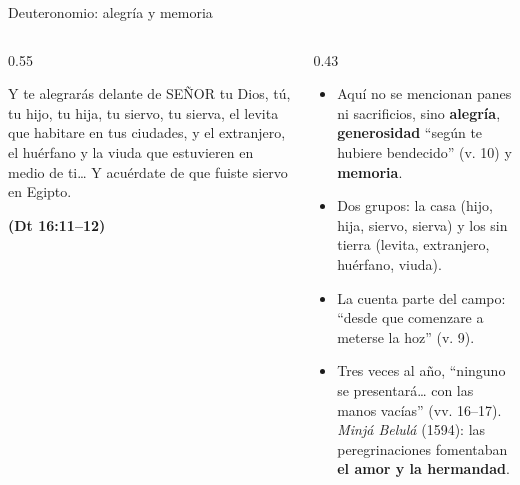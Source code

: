 \documentclass[hyperref={bookmarks=false},aspectratio=169]{beamer}
\newcommand{\SENOR}{S{\fontsize{0.78em}{1em}\selectfont EÑOR}}
\newcommand{\fuente}[1]{\par\hfill{\upshape\bfseries\footnotesize\textcolor{tierraroja}{#1}}}
\newcommand{\destacar}[1]{\textbf{\textcolor{tierraroja}{#1}}}
\begin{document}
\begin{frame}{Deuteronomio: alegría y memoria}
\begin{columns}[c,onlytextwidth]
\begin{column}{0.55\textwidth}
\begin{cita}Y te alegrarás delante de \SENOR{} tu Dios, tú, tu hijo, tu hija, tu siervo, tu sierva, el levita que habitare en tus ciudades, y el extranjero, el huérfano y la viuda que estuvieren en medio de ti\ldots{} Y acuérdate de que fuiste siervo en Egipto.\fuente{(Dt 16:11--12)}\end{cita}
\end{column}
\begin{column}{0.43\textwidth}\small
\begin{itemize}
\item Aquí no se mencionan panes ni sacrificios, sino \destacar{alegría}, \destacar{generosidad} ``según te hubiere bendecido'' (v. 10) y \destacar{memoria}.
\item Dos grupos: la casa (hijo, hija, siervo, sierva) y los sin tierra (levita, extranjero, huérfano, viuda).
\item La cuenta parte del campo: ``desde que comenzare a meterse la hoz'' (v. 9).\item Tres veces al año, ``ninguno se presentará\ldots{} con las manos vacías'' (vv. 16--17). \emph{Minjá Belulá} (1594): las peregrinaciones fomentaban \destacar{el amor y la hermandad}.
\end{itemize}
\end{column}
\end{columns}
\end{frame}
\end{document}

